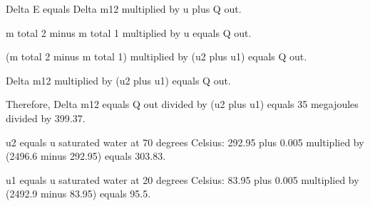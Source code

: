 Delta E equals Delta m12 multiplied by u plus Q out.  

m total 2 minus m total 1 multiplied by u equals Q out.  

(m total 2 minus m total 1) multiplied by (u2 plus u1) equals Q out.  

Delta m12 multiplied by (u2 plus u1) equals Q out.  

Therefore, Delta m12 equals Q out divided by (u2 plus u1) equals 35 megajoules divided by 399.37.  

u2 equals u saturated water at 70 degrees Celsius:  
292.95 plus 0.005 multiplied by (2496.6 minus 292.95) equals 303.83.  

u1 equals u saturated water at 20 degrees Celsius:  
83.95 plus 0.005 multiplied by (2492.9 minus 83.95) equals 95.5.